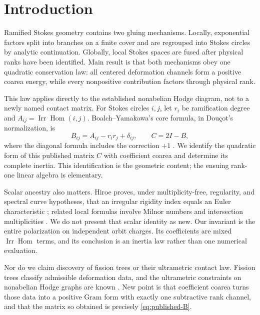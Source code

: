 \documentclass[11pt,a4paper]{amsart}
\theoremstyle{plain}
\theoremstyle{definition}
\newcommand{\Irr}{\operatorname{Irr}}
\newcommand{\Hom}{\operatorname{Hom}}
\begin{document}
\section{Introduction}

Ramified Stokes geometry contains two gluing mechanisms.  Locally, exponential factors split into
branches on a finite cover and are regrouped into Stokes circles by analytic continuation.
Globally, local Stokes spaces are fused after physical ranks have been identified.  Main result is
that both mechanisms obey one quadratic conservation law: all centered deformation channels form
a positive coarea energy, while every nonpositive contribution factors through physical rank.

This law applies directly to the established nonabelian Hodge diagram, not to a newly named
contact matrix.  For Stokes circles $i,j$, let $r_i$ be ramification degree and
$A_{ij}=\Irr\Hom(i,j)$.  Boalch--Yamakawa's core formula, in Dou\c{c}ot's normalization, is
\begin{equation}\label{eq:published-B}
 B_{ij}=A_{ij}-r_ir_j+\delta_{ij},\qquad C=2I-B,
\end{equation}
where the diagonal formula includes the correction $+1$
\cite{BoalchYamakawa2020,Doucot2021}.  We identify the quadratic form of this published matrix
$C$ with coefficient coarea and determine its complete inertia.  This identification is the
geometric content; the ensuing rank-one linear algebra is elementary.

Scalar ancestry also matters.  Hiroe proves, under multiplicity-free, regularity, and spectral
curve hypotheses, that an irregular rigidity index equals an Euler characteristic
\cite{Hiroe2019}; related local formulas involve Milnor numbers and intersection multiplicities
\cite{Hiroe2017}.  We do not present that scalar identity as new.  Our invariant is the entire
polarization on independent orbit charges.  Its coefficients are mixed $\Irr\Hom$ terms, and its
conclusion is an inertia law rather than one numerical evaluation.

Nor do we claim discovery of fission trees or their ultrametric contact law.  Fission trees classify
admissible deformation data, and the ultrametric constraints on nonabelian Hodge graphs are known
\cite{Boalch2025,Doucot2025}.  New point is that coefficient coarea turns those data into a
positive Gram form with exactly one subtractive rank channel, and that the matrix so obtained is
precisely \eqref{eq:published-B}.
\end{document}
